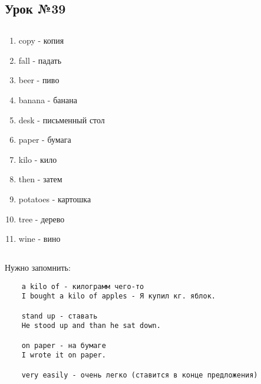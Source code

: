 \subsection{Урок №39}

\subsection*{}
\begin{multicols}{2}
    \begin{enumerate}\setlength{\itemsep}{0pt}
        \item copy - копия
        \item fall - падать
        \item beer - пиво
        \item banana - банана
        \item desk - письменный стол
        \item paper - бумага
        \item kilo - кило
        \item then - затем
        \item potatoes - картошка
        \item tree - дерево
        \item wine - вино
    \end{enumerate}
\end{multicols}

\subsection*{}
Нужно запомнить:
\begin{verbatim}
    a kilo of - килограмм чего-то
    I bought a kilo of apples - Я купил кг. яблок.

    stand up - ставать
    He stood up and than he sat down.

    on paper - на бумаге
    I wrote it on paper.

    very easily - очень легко (ставится в конце предложения)
\end{verbatim}